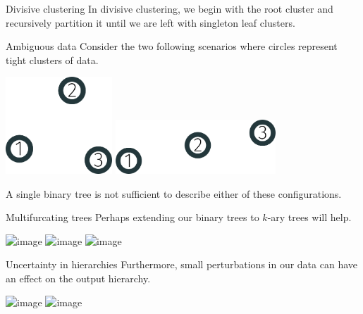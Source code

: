 \documentclass[10pt, compress]{beamer}
\begin{document}
\begin{frame}{Divisive clustering}
  In divisive clustering, we begin with the root cluster
  and recursively partition it until we are left with
  singleton leaf clusters.
\end{frame}

\begin{frame}{Ambiguous data}
  Consider the two following scenarios where
  circles represent tight clusters of data.

  \begin{center}
  \includegraphics[width=0.3\textwidth]{img/3-cluster}\hfill
  \includegraphics[width=0.45\textwidth]{img/3-cluster-line}
  \end{center}

  \pause

  A single binary tree is not sufficient to describe either
  of these configurations.


\end{frame}

\begin{frame}{Multifurcating trees}
  Perhaps extending our binary trees to $k$-ary trees will help.

  \begin{center}
    \includegraphics<1>[width=0.8\textwidth]{img/3-cluster-both.png}
    \includegraphics<2>[width=0.8\textwidth]{img/3-cluster-both-2.png}
    \includegraphics<3>[width=0.8\textwidth]{img/3-cluster-both-3.png}
  \end{center}

\end{frame}

\begin{frame}{Uncertainty in hierarchies}
  Furthermore, small perturbations in our data
  can have an effect on the output
  hierarchy.

  \begin{center}
    \includegraphics<1>[width=0.8\textwidth]{img/3-cluster-line-noperturb}
    \includegraphics<2->[width=0.8\textwidth]{img/3-cluster-line-perturb}
  \end{center}

\end{frame}
\end{document}
